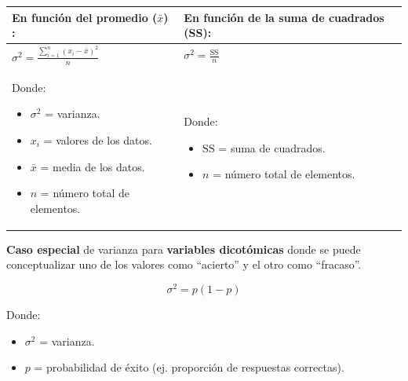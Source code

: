 \documentclass[
  letterpaper,
  DIV=11,
  numbers=noendperiod]{scrreprt}
\providecommand{\tightlist}{%
  \setlength{\itemsep}{0pt}\setlength{\parskip}{0pt}}
\begin{document}
\begin{longtable}[]{@{}
  >{\raggedright\arraybackslash}p{}
  >{\raggedright\arraybackslash}p{}@{}}
\toprule\noalign{}
\begin{minipage}[b]{\linewidth}\raggedright
En función del promedio (\(\bar{x}\)) :
\end{minipage} & \begin{minipage}[b]{\linewidth}\raggedright
En función de la suma de cuadrados (SS):
\end{minipage} \\
\midrule\noalign{}
\endhead
\bottomrule\noalign{}
\endlastfoot
\(
\sigma^2 = \frac{\sum_{i=1}^{n} (x_i - \bar{x})^2}{n}
\) & \(
\sigma^2 = \frac{\text{SS}}{n}
\) \\
\begin{minipage}[t]{\linewidth}\raggedright
Donde:

\begin{itemize}
\tightlist
\item
  \(\sigma^2\) = varianza.
\item
  \(x_i\) = valores de los datos.
\item
  \(\bar{x}\) = media de los datos.
\item
  \(n\) = número total de elementos.
\end{itemize}
\end{minipage} & \begin{minipage}[t]{\linewidth}\raggedright
Donde:

\begin{itemize}
\tightlist
\item
  \(\text{SS}\) = suma de cuadrados.
\item
  \(n\) = número total de elementos.
\end{itemize}
\end{minipage} \\
\end{longtable}

\textbf{Caso especial} de varianza para \textbf{variables dicotómicas}
donde se puede conceptualizar uno de los valores como ``acierto'' y el
otro como ``fracaso''.

\[
\sigma^2 = p(1-p)
\]

Donde:

\begin{itemize}
\tightlist
\item
  \(\sigma^2\) = varianza.
\item
  \(p\) = probabilidad de éxito (ej. proporción de respuestas
  correctas).
\end{itemize}
\end{document}
